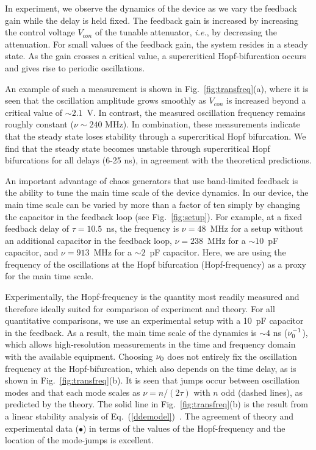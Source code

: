 \documentclass[aps,twocolumn,pre,nofootinbib]{revtex4}
\begin{document}
In experiment, we observe the dynamics of the device as we vary the feedback gain while the delay is held fixed. The feedback gain is increased by increasing the control voltage $V_{con}$ of the tunable attenuator, {\it i.e.}, by decreasing the attenuation. 
For small values of the feedback gain, the system resides in a steady state. As the gain crosses a critical value, a supercritical Hopf-bifurcation occurs and gives rise to periodic oscillations.

An example of such a measurement is shown in Fig.~\ref{fig:transfreq}(a), where it is seen that the oscillation amplitude grows smoothly as $V_{con}$ is increased beyond a critical value of $\sim \! 2.1$~V. In contrast, the measured oscillation frequency remains roughly constant ($\nu \! \sim \! 240$ MHz). In combination, these measurements indicate that the steady state loses stability through a supercritical Hopf bifurcation.
We find that the steady state becomes unstable through supercritical Hopf bifurcations for all delays (6-25 ns), in agreement with the theoretical predictions.


An important advantage of chaos generators that use band-limited feedback is the ability to tune the main time scale of the device dynamics.
In our device, the main time scale can be varied by more than a factor of ten simply by changing the capacitor in the feedback loop (see Fig.~\ref{fig:setup}).
 For example, at a fixed feedback delay of $\tau=10.5$~ns, the frequency is $\nu = 48$~MHz for a setup without an additional capacitor in the feedback loop, $\nu = 238$~MHz for a $\sim \! 10$~pF capacitor, and $\nu = 913$~MHz for a $\sim \! 2$~pF capacitor.
Here, we are using the frequency of the oscillations at the Hopf bifurcation (Hopf-frequency) as a proxy for the main time scale. 


Experimentally, the Hopf-frequency is the quantity most readily measured and therefore ideally suited for comparison of experiment and theory.
For all quantitative comparisons, we use an experimental setup with a 10~pF capacitor in the feedback. As a result, the main time scale of the dynamics is  $\sim \! 4$ ns ($\nu_0^{-1}$), which allows high-resolution measurements in the time and frequency domain with the available equipment.
Choosing $\nu_0$ does not entirely fix the oscillation frequency at the Hopf-bifurcation, which also depends on the time delay, as is shown in Fig.~\ref{fig:transfreq}(b). It is seen that jumps occur between oscillation modes and that each mode scales as $\nu = n/(2 \tau)$ with $n$ odd (dashed lines), as predicted by the theory. 
The solid line in Fig.~\ref{fig:transfreq}(b) is the result from a linear stability analysis of Eq.~(\ref{ddemodel})~\cite{illing2005}. The agreement of theory and experimental data ($\bullet$) in terms of the values of the Hopf-frequency  and the location of the mode-jumps is excellent.
\end{document}
